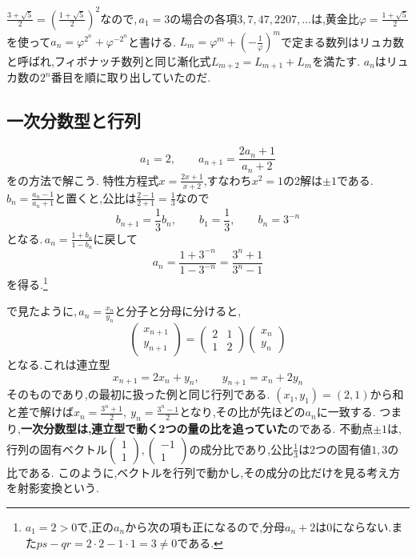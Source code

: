$\frac{3+\sqrt5}{2}=\left(\frac{1+\sqrt5}{2}\right)^2$なので,\,$a_1=3$の場合の各項$3,7,47,2207,\ldots$は,黄金比$\varphi=\frac{1+\sqrt5}{2}$を使って$a_n=\varphi^{2^n}+\varphi^{-2^n}$と書ける.
$L_m=\varphi^m+\left(-\frac1\varphi\right)^m$で定まる数列はリュカ数と呼ばれ,フィボナッチ数列と同じ漸化式$L_{m+2}=L_{m+1}+L_m$を満たす.
$a_n$はリュカ数の$2^n$番目を順に取り出していたのだ.

\subsection{一次分数型と行列}\label{節：一次分数型と行列}

\[
  a_1=2,\qquad a_{n+1}=\frac{2a_n+1}{a_n+2}
\]
をの方法で解こう.
特性方程式$x=\frac{2x+1}{x+2}$,すなわち$x^2=1$の2解は$\pm1$である.
$b_n=\frac{a_n-1}{a_n+1}$と置くと,公比は$\frac{2-1}{2+1}=\frac13$なので
\[
  b_{n+1}=\frac13b_n,\qquad b_1=\frac13,\qquad b_n=3^{-n}
\]
となる.\,$a_n=\frac{1+b_n}{1-b_n}$に戻して
\[
  a_n=\frac{1+3^{-n}}{1-3^{-n}}=\frac{3^n+1}{3^n-1}
\]
を得る.\footnote{$a_1=2>0$で,正の$a_n$から次の項も正になるので,分母$a_n+2$は0にならない.また$ps-qr=2\cdot2-1\cdot1=3\ne0$である.}

で見たように,\,$a_n=\frac{x_n}{y_n}$と分子と分母に分けると,
\[
  \begin{pmatrix}x_{n+1}\\y_{n+1}\end{pmatrix}
  =\begin{pmatrix}2&1\\1&2\end{pmatrix}
  \begin{pmatrix}x_n\\y_n\end{pmatrix}
\]
となる.これは連立型
\[
  x_{n+1}=2x_n+y_n,\qquad y_{n+1}=x_n+2y_n
\]
そのものであり,の最初に扱った例と同じ行列である.
$(x_1,y_1)=(2,1)$から和と差で解けば$x_n=\frac{3^n+1}{2},\ y_n=\frac{3^n-1}{2}$となり,その比が先ほどの$a_n$に一致する.
つまり,\textbf{一次分数型は,連立型で動く2つの量の比を追っていた}のである.
不動点$\pm1$は,行列の固有ベクトル$\begin{pmatrix}1\\1\end{pmatrix},\begin{pmatrix}-1\\1\end{pmatrix}$の成分比であり,公比$\frac13$は2つの固有値$1,3$の比である.
このように,ベクトルを行列で動かし,その成分の比だけを見る考え方を射影変換という.


